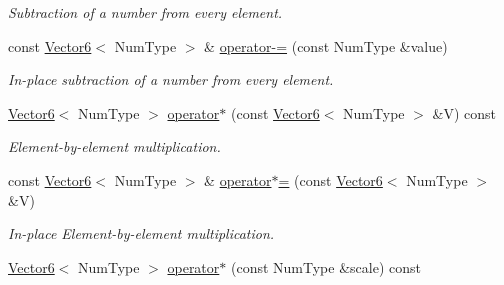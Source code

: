 \begin{DoxyCompactItemize}
\begin{DoxyCompactList}\small\item\em Subtraction of a number from every element. \end{DoxyCompactList}\item 
\hypertarget{singletonscrews_1_1_vector6_a49e48a991323c3cfb2b05aa88da19cc6}{const \hyperlink{singletonscrews_1_1_vector6}{Vector6}$<$ Num\+Type $>$ \& \hyperlink{singletonscrews_1_1_vector6_a49e48a991323c3cfb2b05aa88da19cc6}{operator-\/=} (const Num\+Type \&value)}\label{singletonscrews_1_1_vector6_a49e48a991323c3cfb2b05aa88da19cc6}

\begin{DoxyCompactList}\small\item\em In-\/place subtraction of a number from every element. \end{DoxyCompactList}\item 
\hypertarget{singletonscrews_1_1_vector6_a99b6e0e95ab5cf91dd9e88de5c66f8b6}{\hyperlink{singletonscrews_1_1_vector6}{Vector6}$<$ Num\+Type $>$ \hyperlink{singletonscrews_1_1_vector6_a99b6e0e95ab5cf91dd9e88de5c66f8b6}{operator$\ast$} (const \hyperlink{singletonscrews_1_1_vector6}{Vector6}$<$ Num\+Type $>$ \&V) const }\label{singletonscrews_1_1_vector6_a99b6e0e95ab5cf91dd9e88de5c66f8b6}

\begin{DoxyCompactList}\small\item\em Element-\/by-\/element multiplication. \end{DoxyCompactList}\item 
\hypertarget{singletonscrews_1_1_vector6_a282a3be894a89952929763ed6bc79df6}{const \hyperlink{singletonscrews_1_1_vector6}{Vector6}$<$ Num\+Type $>$ \& \hyperlink{singletonscrews_1_1_vector6_a282a3be894a89952929763ed6bc79df6}{operator$\ast$=} (const \hyperlink{singletonscrews_1_1_vector6}{Vector6}$<$ Num\+Type $>$ \&V)}\label{singletonscrews_1_1_vector6_a282a3be894a89952929763ed6bc79df6}

\begin{DoxyCompactList}\small\item\em In-\/place Element-\/by-\/element multiplication. \end{DoxyCompactList}\item 
\hypertarget{singletonscrews_1_1_vector6_aaff730062e4b807b3e38b7dc0ac4905f}{\hyperlink{singletonscrews_1_1_vector6}{Vector6}$<$ Num\+Type $>$ \hyperlink{singletonscrews_1_1_vector6_aaff730062e4b807b3e38b7dc0ac4905f}{operator$\ast$} (const Num\+Type \&scale) const }\label{singletonscrews_1_1_vector6_aaff730062e4b807b3e38b7dc0ac4905f}


\end{DoxyCompactItemize}
